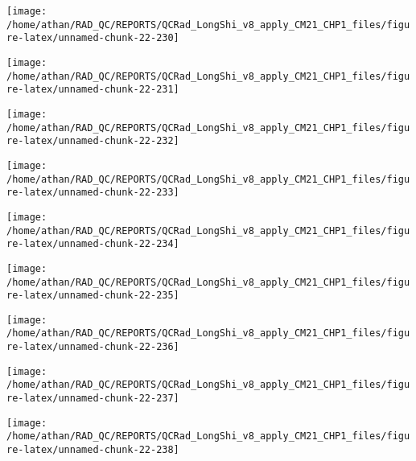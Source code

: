 \documentclass[
  10pt,
  a4paper,oneside]{article}
\begin{document}
\begin{center}\texttt{[image: /home/athan/RAD\_QC/REPORTS/QCRad\_LongShi\_v8\_apply\_CM21\_CHP1\_files/figure-latex/unnamed-chunk-22-230]} \end{center}

\begin{center}\texttt{[image: /home/athan/RAD\_QC/REPORTS/QCRad\_LongShi\_v8\_apply\_CM21\_CHP1\_files/figure-latex/unnamed-chunk-22-231]} \end{center}

\begin{center}\texttt{[image: /home/athan/RAD\_QC/REPORTS/QCRad\_LongShi\_v8\_apply\_CM21\_CHP1\_files/figure-latex/unnamed-chunk-22-232]} \end{center}

\begin{center}\texttt{[image: /home/athan/RAD\_QC/REPORTS/QCRad\_LongShi\_v8\_apply\_CM21\_CHP1\_files/figure-latex/unnamed-chunk-22-233]} \end{center}

\begin{center}\texttt{[image: /home/athan/RAD\_QC/REPORTS/QCRad\_LongShi\_v8\_apply\_CM21\_CHP1\_files/figure-latex/unnamed-chunk-22-234]} \end{center}

\begin{center}\texttt{[image: /home/athan/RAD\_QC/REPORTS/QCRad\_LongShi\_v8\_apply\_CM21\_CHP1\_files/figure-latex/unnamed-chunk-22-235]} \end{center}

\begin{center}\texttt{[image: /home/athan/RAD\_QC/REPORTS/QCRad\_LongShi\_v8\_apply\_CM21\_CHP1\_files/figure-latex/unnamed-chunk-22-236]} \end{center}

\begin{center}\texttt{[image: /home/athan/RAD\_QC/REPORTS/QCRad\_LongShi\_v8\_apply\_CM21\_CHP1\_files/figure-latex/unnamed-chunk-22-237]} \end{center}

\begin{center}\texttt{[image: /home/athan/RAD\_QC/REPORTS/QCRad\_LongShi\_v8\_apply\_CM21\_CHP1\_files/figure-latex/unnamed-chunk-22-238]} \end{center}
\end{document}

